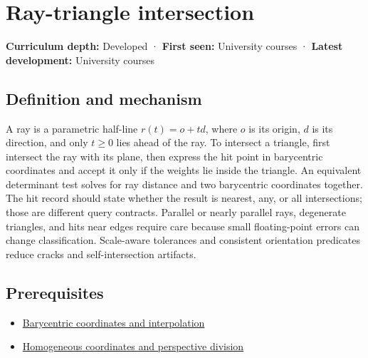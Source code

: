 \hypertarget{appendix-47ac1bd6d144}{}\label{referencestart:appendix-47ac1bd6d144}
\section{Ray-triangle intersection}\label{appendix-47ac1bd6d144-ray-triangle-intersection}

\hypertarget{appendix-47ac1bd6d144-ray-triangle-intersection}{}

\textbf{Curriculum depth:} Developed · \textbf{First seen:} University courses · \textbf{Latest development:} University courses

\begin{allmightroledefinition}

\subsection{Definition and mechanism}\label{appendix-47ac1bd6d144-definition-and-mechanism}

\hypertarget{appendix-47ac1bd6d144-definition-and-mechanism}{}

A ray is a parametric half-line \(r(t)=o+td\), where \(o\) is its origin, \(d\) is its direction, and only \(t\ge0\) lies ahead of the ray. To intersect a triangle, first intersect the ray with its plane, then express the hit point in barycentric coordinates and accept it only if the weights lie inside the triangle. An equivalent determinant test solves for ray distance and two barycentric coordinates together. The hit record should state whether the result is nearest, any, or all intersections; those are different query contracts. Parallel or nearly parallel rays, degenerate triangles, and hits near edges require care because small floating-point errors can change classification. Scale-aware tolerances and consistent orientation predicates reduce cracks and self-intersection artifacts.

\end{allmightroledefinition}

\subsection{Prerequisites}\label{appendix-47ac1bd6d144-prerequisites}

\hypertarget{appendix-47ac1bd6d144-prerequisites}{}

\begin{itemize}
\tightlist
\item
  \hyperref[appendix-02b9d9a81dca]{Barycentric coordinates and interpolation}
\item
  \hyperref[appendix-cb3b26862282]{Homogeneous coordinates and perspective division}
\end{itemize}

